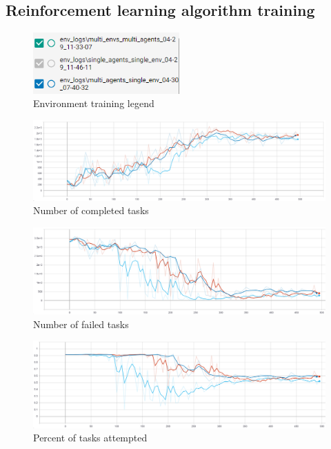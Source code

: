 \subsection{Reinforcement learning algorithm training}\label{subsec:reinforcement-learning-algorithm-training}
\begin{figure}
    \includegraphics[width=0.5\textwidth]{figures/env_training_fig/legend.PNG}
    \caption{Environment training legend}
    \label{fig:algo-training-legend}
\end{figure}

\begin{figure}[h]
    \centering
    \includegraphics[width=15cm]{figures/algo_training_fig/num_completed_tasks.PNG}
    \caption{Number of completed tasks}
    \label{fig:algo_num_completed_tasks}
\end{figure}

\begin{figure}[h]
    \centering
    \includegraphics[width=15cm]{figures/algo_training_fig/num_failed_tasks.png}
    \caption{Number of failed tasks}
    \label{fig:algo_num_failed_tasks}
\end{figure}

\begin{figure}[h]
    \centering
    \includegraphics[width=15cm]{figures/algo_training_fig/percent_tasks.png}
    \caption{Percent of tasks attempted}
    \label{fig:algo_percent_tasks}
\end{figure}

